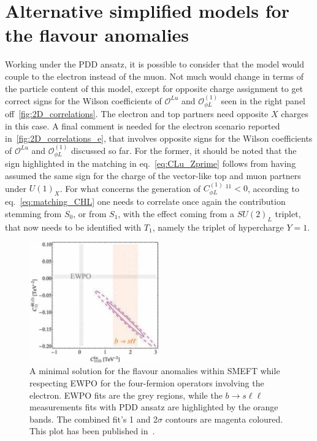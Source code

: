 



\chapter{Alternative simplified models for the flavour anomalies}
\label{app:EW}
Working under the PDD ansatz, it is possible to consider that the model would couple to the electron instead of the muon. Not much would change in terms of the particle content of this model, except for opposite charge assignment to get correct signs for the Wilson coefficients of $\mathcal O^{Lu}$ and $\mathcal O_{\phi L}^{(1)}$ seen in the right panel off~\autoref{fig:2D_correlations}. The electron and top partners need opposite $X$ charges in this case.
A final comment is needed for the electron scenario reported in~\autoref{fig:2D_correlations_e}, that involves opposite signs for the Wilson coefficients of $\mathcal O^{Lu}$ and $\mathcal O_{\phi L}^{(1)}$ discussed so far. For the former, it should be noted that the sign highlighted in the matching in eq.~\eqref{eq:CLu_Zprime} follows from having assumed the same sign for the charge of the vector-like top and muon partners under $U(1)_{X}$. For what concerns the generation of $C_{\phi L}^{(1)} \ ^{11} < 0 $, according to eq.~\eqref{eq:matching_CHL} one needs to correlate once again the contribution stemming from $S_{0}$, or from $S_{1}$, with the effect coming from a $SU(2)_{L}$ triplet, that now needs to be identified with $T_{1}$, namely the triplet of hypercharge $Y=1$.
\begin{figure}[htpb!]
	\centering
	\includegraphics[width=0.5\textwidth]{figures/CHL_CLu_e.pdf}
	\caption{ A minimal solution for the flavour anomalies within SMEFT while respecting EWPO for the four-fermion operators involving the electron. EWPO fits are the grey regions, while the $b \to s\ell \ell$ measurements fits with PDD ansatz are highlighted by the orange bands. The combined fit's 1 and 2$\sigma$ contours are magenta coloured. This plot has been published in~\cite{Alasfar:2020mne}.  } 
	\label{fig:2D_correlations_e}
\end{figure}

